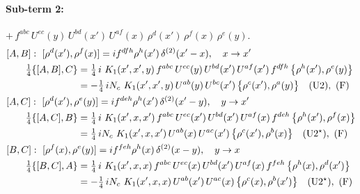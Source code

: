 \documentclass[10pt]{article}
\numberwithin{equation}{section}
\begin{document}
\paragraph{Sub-term 2:} $+\,f^{abc}\,U^{ec}(y)\,U^{bd}(x')\,U^{af}(x)\,\rho^{d}(x')\,\rho^{f}(x)\,\rho^{e}(y)$.
\begin{align}
&[A,B]:\ [\rho^{d}(x'),\rho^{f}(x)]=i f^{dfh}\rho^{h}(x')\,\delta^{(2)}(x'-x),\quad x\to x'\notag\\
&\qquad \tfrac14\{[A,B],C\}=\tfrac14\,i\,\,K_1(x',x',y)\,f^{abc}\,U^{ec}(y)\,U^{bd}(x')\,U^{af}(x')\,f^{dfh}\,\big\{\rho^{h}(x'),\rho^{e}(y)\big\}\notag\\
&\qquad\phantom{\tfrac14\{[A,B],C\}}=-\tfrac14\,i N_{c}\,\,K_1(x',x',y)\,U^{ab}(y)\,U^{bc}(x')\,\big\{\rho^{c}(x'),\rho^{a}(y)\big\}\quad\text{(U2)},\ \text{(F)}
\label{R:eq:B1-2-AB}\\
&[A,C]:\ [\rho^{d}(x'),\rho^{e}(y)]=i f^{deh}\rho^{h}(x')\,\delta^{(2)}(x'-y),\quad y\to x'\notag\\
&\qquad \tfrac14\{[A,C],B\}=\tfrac14\,i\,\,K_1(x',x,x')\,f^{abc}\,U^{ec}(x')\,U^{bd}(x')\,U^{af}(x)\,f^{deh}\,\big\{\rho^{h}(x'),\rho^{f}(x)\big\}\notag\\
&\qquad\phantom{\tfrac14\{[A,C],B\}}=\tfrac14\,i N_{c}\,\,K_1(x',x,x')\,U^{ab}(x)\,U^{ac}(x')\,\big\{\rho^{c}(x'),\rho^{b}(x)\big\}\quad\text{(U2$^\star$)},\ \text{(F)}
\label{R:eq:B1-2-AC}\\
&[B,C]:\ [\rho^{f}(x),\rho^{e}(y)]=i f^{feh}\rho^{h}(x)\,\delta^{(2)}(x-y),\quad y\to x\notag\\
&\qquad \tfrac14\{[B,C],A\}=\tfrac14\,i\,\,K_1(x',x,x)\,f^{abc}\,U^{ec}(x)\,U^{bd}(x')\,U^{af}(x)\,f^{feh}\,\big\{\rho^{h}(x),\rho^{d}(x')\big\}\notag\\
&\qquad\phantom{\tfrac14\{[B,C],A\}}=-\tfrac14\,i N_{c}\,\,K_1(x',x,x)\,U^{ab}(x')\,U^{ac}(x)\,\big\{\rho^{c}(x),\rho^{b}(x')\big\}\quad\text{(U2$^\star$)},\ \text{(F)}
\label{R:eq:B1-2-BC}
\end{align}
\end{document}
